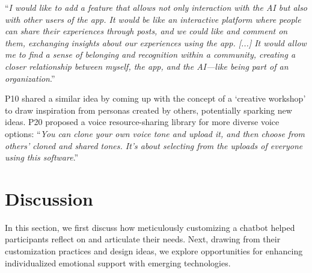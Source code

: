``\textit{I would like to add a feature that allows not only interaction with the AI but also with other users of the app. It would be like an interactive platform where people can share their experiences through posts, and we could like and comment on them, exchanging insights about our experiences using the app. [...] It would allow me to find a sense of belonging and recognition within a community, creating a closer relationship between myself, the app, and the AI—like being part of an organization}.''

P10 shared a similar idea by coming up with the concept of a `creative workshop' to draw inspiration from personas created by others, potentially sparking new ideas. P20 proposed a voice resource-sharing library for more diverse voice options: 
``\textit{You can clone your own voice tone and upload it, and then choose from others' cloned and shared tones. It's about selecting from the uploads of everyone using this software}.''



\section{Discussion}

In this section, we first discuss how meticulously customizing a chatbot helped participants reflect on and articulate their needs. Next, drawing from their customization practices and design ideas, we explore opportunities for enhancing individualized emotional support with emerging technologies. 

